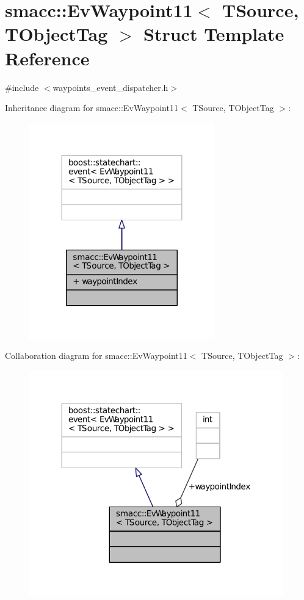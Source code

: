 \hypertarget{structsmacc_1_1EvWaypoint11}{}\section{smacc\+:\+:Ev\+Waypoint11$<$ T\+Source, T\+Object\+Tag $>$ Struct Template Reference}
\label{structsmacc_1_1EvWaypoint11}


{\ttfamily \#include $<$waypoints\+\_\+event\+\_\+dispatcher.\+h$>$}



Inheritance diagram for smacc\+:\+:Ev\+Waypoint11$<$ T\+Source, T\+Object\+Tag $>$\+:
\nopagebreak
\begin{figure}[H]
\begin{center}
\leavevmode
\includegraphics[width=227pt]{structsmacc_1_1EvWaypoint11__inherit__graph}
\end{center}
\end{figure}


Collaboration diagram for smacc\+:\+:Ev\+Waypoint11$<$ T\+Source, T\+Object\+Tag $>$\+:
\nopagebreak
\begin{figure}[H]
\begin{center}
\leavevmode
\includegraphics[width=312pt]{structsmacc_1_1EvWaypoint11__coll__graph}
\end{center}
\end{figure}
